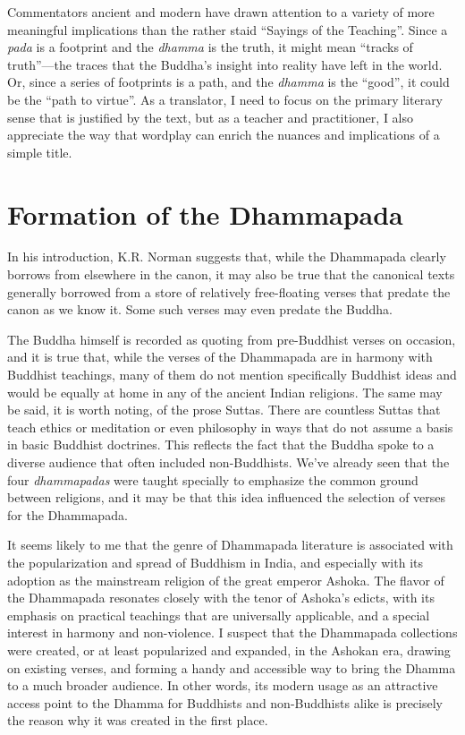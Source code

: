 \documentclass[12pt,openany]{book}%
\begin{document}
Commentators ancient and modern have drawn attention to a variety of more meaningful implications than the rather staid “Sayings of the Teaching”. Since a \textit{pada} is a footprint and the \textit{dhamma} is the truth, it might mean “tracks of truth”—the traces that the Buddha’s insight into reality have left in the world. Or, since a series of footprints is a path, and the \textit{dhamma} is the “good”, it could be the “path to virtue”. As a translator, I need to focus on the primary literary sense that is justified by the text, but as a teacher and practitioner, I also appreciate the way that wordplay can enrich the nuances and implications of a simple title.

\section*{Formation of the Dhammapada}

In his introduction, K.R. Norman suggests that, while the Dhammapada clearly borrows from elsewhere in the canon, it may also be true that the canonical texts generally borrowed from a store of relatively free-floating verses that predate the canon as we know it. Some such verses may even predate the Buddha.

The Buddha himself is recorded as quoting from pre-Buddhist verses on occasion, and it is true that, while the verses of the Dhammapada are in harmony with Buddhist teachings, many of them do not mention specifically Buddhist ideas and would be equally at home in any of the ancient Indian religions. The same may be said, it is worth noting, of the prose Suttas. There are countless Suttas that teach ethics or meditation or even philosophy in ways that do not assume a basis in basic Buddhist doctrines. This reflects the fact that the Buddha spoke to a diverse audience that often included non-Buddhists. We’ve already seen that the four \textit{dhammapadas} were taught specially to emphasize the common ground between religions, and it may be that this idea influenced the selection of verses for the Dhammapada.

It seems likely to me that the genre of Dhammapada literature is associated with the popularization and spread of Buddhism in India, and especially with its adoption as the mainstream religion of the great emperor Ashoka. The flavor of the Dhammapada resonates closely with the tenor of Ashoka’s edicts, with its emphasis on practical teachings that are universally applicable, and a special interest in harmony and non-violence. I suspect that the Dhammapada collections were created, or at least popularized and expanded, in the Ashokan era, drawing on existing verses, and forming a handy and accessible way to bring the Dhamma to a much broader audience. In other words, its modern usage as an attractive access point to the Dhamma for Buddhists and non-Buddhists alike is precisely the reason why it was created in the first place.
\end{document}

